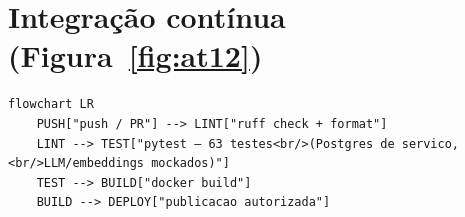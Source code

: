 \section{Integração contínua (Figura~\ref{fig:at12})}

\begin{lstlisting}[language=mermaid, caption={Fluxo de integração contínua, forma compacta}, label={lst:mmci}]
flowchart LR
    PUSH["push / PR"] --> LINT["ruff check + format"]
    LINT --> TEST["pytest — 63 testes<br/>(Postgres de servico,<br/>LLM/embeddings mockados)"]
    TEST --> BUILD["docker build"]
    BUILD --> DEPLOY["publicacao autorizada"]
\end{lstlisting}
